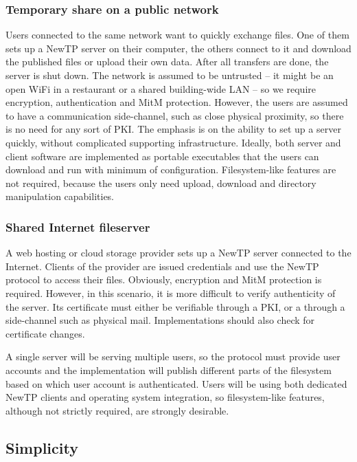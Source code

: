 \subsubsection{Temporary share on a public network}

Users connected to the same network want to quickly exchange files. One of them sets up a NewTP server on
their computer, the others connect to it and download the published files or upload their own data. After all
transfers are done, the server is shut down. The network is assumed to be untrusted -- it might be an open WiFi
in a restaurant or a shared building-wide LAN -- so we require encryption, authentication and MitM protection.
However, the users are assumed to have a communication side-channel, such as close physical proximity, so
there is no need for any sort of PKI. The emphasis is on the ability to set up a server quickly, without
complicated supporting infrastructure. Ideally, both server and client software are implemented as portable
executables that the users can download and run with minimum of configuration. Filesystem-like features are
not required, because the users only need upload, download and directory manipulation capabilities.

\subsubsection{Shared Internet fileserver}

A web hosting or cloud storage provider sets up a NewTP server connected to the Internet. Clients of the
provider are issued credentials and use the NewTP protocol to access their files. Obviously, encryption and
MitM protection is required. However, in this scenario, it is more difficult to verify authenticity of the
server. Its certificate must either be verifiable through a PKI, or a through a side-channel such as physical
mail.  Implementations should also check for certificate changes.

A single server will be serving multiple users, so the protocol must provide user accounts and the
implementation will publish different parts of the filesystem based on which user account is authenticated.
Users will be using both dedicated NewTP clients and operating system integration, so filesystem-like
features, although not strictly required, are strongly desirable.


\subsection{Simplicity}

